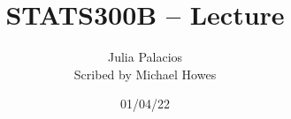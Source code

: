 




\title{STATS300B -- Lecture }
\author{Julia Palacios\\ Scribed by Michael Howes}
\date{01/04/22}

\pagestyle{fancy}
\fancyhf{}


\maketitle
\tableofcontents
